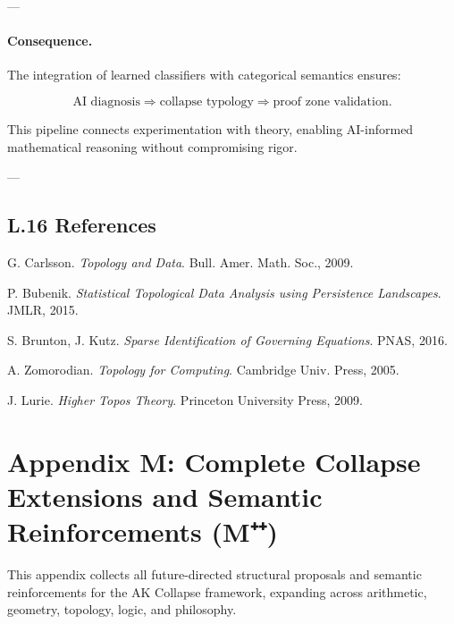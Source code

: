 \documentclass[11pt]{article}
\begin{document}
\begin{axiom}
\begin{axiom}
{{---

\paragraph{Consequence.}

The integration of learned classifiers with categorical semantics ensures:

\[
\text{AI diagnosis} \Rightarrow \text{collapse typology} \Rightarrow \text{proof zone validation}.
\]

This pipeline connects experimentation with theory, enabling AI-informed mathematical reasoning  
without compromising rigor.

---

\subsection*{L.16 References}

\begin{thebibliography}{9}

G. Carlsson.  
\textit{Topology and Data}. Bull. Amer. Math. Soc., 2009.

P. Bubenik.  
\textit{Statistical Topological Data Analysis using Persistence Landscapes}. JMLR, 2015.

S. Brunton, J. Kutz.  
\textit{Sparse Identification of Governing Equations}. PNAS, 2016.

A. Zomorodian.  
\textit{Topology for Computing}. Cambridge Univ. Press, 2005.

J. Lurie.  
\textit{Higher Topos Theory}. Princeton University Press, 2009.

\end{thebibliography}



\section*{Appendix M: Complete Collapse Extensions and Semantic Reinforcements (M⁺⁺)}

This appendix collects all future-directed structural proposals and semantic reinforcements  
for the AK Collapse framework, expanding across arithmetic, geometry, topology, logic, and philosophy.

}}
\end{axiom}
\end{axiom}
\end{document}
